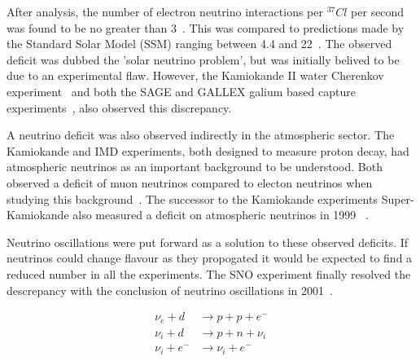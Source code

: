 After analysis, the number of electron neutrino interactions per ${}^{37}Cl$ per second was found
to be no greater than 3~\cite{davis1968}. This was compared to predictions made by the Standard
Solar Model (SSM) ranging between 4.4 and 22~\cite{bahcall1968}. The observed deficit was dubbed
the 'solar neutrino problem', but was initially belived to be due to an experimental flaw.
However, the Kamiokande II water Cherenkov experiment~\cite{hirata1989} and both the SAGE and
GALLEX galium based capture experiments~\cite{abazov1991, anselmann1994}, also observed this
discrepancy.

A neutrino deficit was also observed indirectly in the atmospheric sector. The Kamiokande and IMD
experiments, both designed to measure proton decay, had atmospheric neutrinos as an important
background to be understood. Both observed a deficit of muon neutrinos compared to electon
neutrinos when studying this background~\cite{hirata1988, becker1992}. The successor to the
Kamiokande experiments Super-Kamiokande also measured a deficit on atmospheric neutrinos in 1999
~\cite{kajita1999}.

Neutrino oscillations were put forward as a solution to these observed deficits. If neutrinos
could change flavour as they propogated it would be expected to find a reduced number in all the
experiments. The SNO experiment finally resolved the descrepancy with the conclusion of neutrino
oscillations in 2001~\cite{ahmad2002}.

\begin{align} %
    \nu_{e}+d     & \rightarrow p+p+e^{-}     \\
    \nu_{i}+d     & \rightarrow p+n+\nu_{i}   \\
    \nu_{i}+e^{-} & \rightarrow \nu_{i}+e^{-}
\end{align} %

~\cite{ahmad2002}

